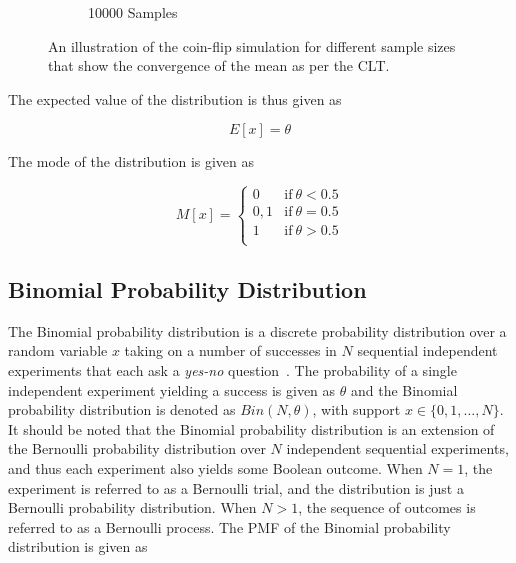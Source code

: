 \begin{figure}[htbp]
\begin{subfigure}{0.49\textwidth}
            \caption{10000 Samples}
            \label{fig:probability:probability_distributions:bernoulli:coin_10000}
      \end{subfigure}
      \par\bigskip
      \caption{An illustration of the coin-flip simulation for different sample sizes that show the convergence of the mean as per the \acf{CLT}.}
      \label{fig:probability:probability_distributions:bernoulli:coin}
\end{figure}

The expected value of the distribution is thus given as

\begin{equation}
      \label{eq:probability:probability_distributions:bernoulli:expected_value}
      E[x] = \theta
\end{equation}

The mode of the distribution is given as

\begin{equation}
      \label{eq:probability:probability_distributions:bernoulli:mode}
      M[x] =
      \begin{cases}
            0   & \text{if}\ \theta < 0.5 \\
            0,1 & \text{if}\ \theta = 0.5 \\
            1   & \text{if}\ \theta > 0.5 \\
      \end{cases}
\end{equation}


\subsection{Binomial Probability Distribution}\label{sec:probability:probability_distributions:bin}


The Binomial probability distribution is a discrete probability distribution over a random variable $x$ taking on a number of successes in $N$ sequential independent experiments that each ask a \textit{yes-no} question~\cite{ref:wackerly:2014}. The probability of a single independent experiment yielding a success is given as $\theta$ and the Binomial probability distribution is denoted as $Bin(N, \theta)$, with support $x \in \{0, 1, \dots, N\}$.  It should be noted that the Binomial probability distribution is an extension of the Bernoulli probability distribution over $N$ independent sequential experiments, and thus each experiment also yields some Boolean outcome. When $N=1$, the experiment is referred to as a Bernoulli trial, and the distribution is just a Bernoulli probability distribution. When $N > 1$, the sequence of outcomes is referred to as a Bernoulli process. The \acs{PMF} of the Binomial probability distribution is given as

